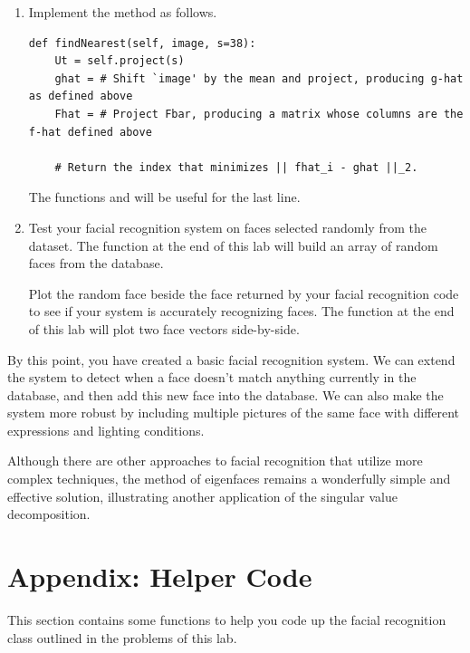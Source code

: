 \begin{problem}
\label{prob:nearest}
\leavevmode
\begin{enumerate}
\item
Implement the method  as follows.
\begin{lstlisting}
def findNearest(self, image, s=38):
    Ut = self.project(s)
    ghat = # Shift `image' by the mean and project, producing g-hat as defined above
    Fhat = # Project Fbar, producing a matrix whose columns are the f-hat defined above 
        
    # Return the index that minimizes || fhat_i - ghat ||_2.
\end{lstlisting}
The functions  and  will be useful for the last line.

\item Test your facial recognition system on faces selected randomly from the  dataset.
The function  at the end of this lab will build an array of  random faces from the  database.

Plot the random face beside the face returned by your facial recognition code to see if your system is accurately recognizing faces.
The function  at the end of this lab will plot two face vectors side-by-side.

\end{enumerate}
\end{problem}


By this point, you have created a basic facial recognition system.
We can extend the system to detect when a face doesn't match anything currently in the database, and then add this new face into the database.
We can also make the system more robust by including multiple pictures of the same face with different expressions and lighting conditions.

Although there are other approaches to facial recognition that utilize more complex techniques, the method of eigenfaces remains
a wonderfully simple and effective solution, illustrating another application of the singular value decomposition.

\section*{Appendix: Helper Code}
This section contains some functions to help you code up the facial recognition class outlined in the problems of this lab.

